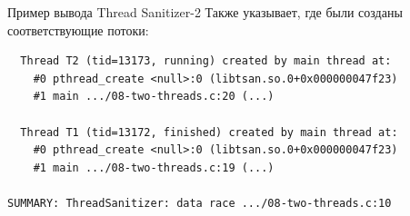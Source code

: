 \begin{frame}[fragile]{Пример вывода Thread Sanitizer-2}
	Также указывает, где были созданы соответствующие потоки:
\begin{verbatim}
  Thread T2 (tid=13173, running) created by main thread at:
    #0 pthread_create <null>:0 (libtsan.so.0+0x000000047f23)
    #1 main .../08-two-threads.c:20 (...)

  Thread T1 (tid=13172, finished) created by main thread at:
    #0 pthread_create <null>:0 (libtsan.so.0+0x000000047f23)
    #1 main .../08-two-threads.c:19 (...)

SUMMARY: ThreadSanitizer: data race .../08-two-threads.c:10
\end{verbatim}
\end{frame}

